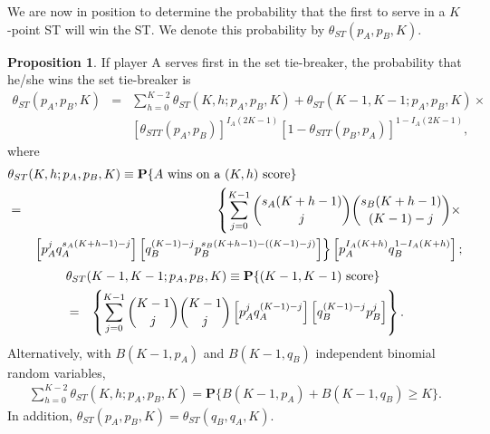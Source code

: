 \documentclass[11pt]{article}
\theoremstyle{plain}
\theoremstyle{definition}
\newtheorem{proposition}[theorem]{Proposition}
\renewcommand{\Pr}{\mathbf{P}}
\begin{document}
We are now in position to determine the probability that the first to serve in a $K$-point ST will win the ST. We denote this probability by $\theta_{ST}(p_A,p_B,K)$.

\begin{proposition}
\label{prop: set tie-breaker probs}
    If player A serves first in the set tie-breaker, the probability that he/she wins the set tie-breaker is
    \begin{eqnarray*}
    \theta_{ST}(p_A,p_B,K)  & = &  \sum_{h=0}^{K-2} \theta_{ST}(K,h;p_A,p_B,K) + 
     \theta_{ST}(K-1,K-1;p_A,p_B,K) \times \\ &&
     [\theta_{STT}(p_A,p_B)]^{I_A(2K-1)} [1-\theta_{STT}(p_B,p_A)]^{1-I_A(2K-1)},
    \end{eqnarray*}
    where
    \begin{eqnarray*}
   \lefteqn{     \theta_{ST}(K,h;p_A,p_B,K) \equiv  \Pr\{\mbox{$A$ wins on a $(K,h)$ score}\}  } \\ & = & \left\{
        \sum_{j=0}^{K-1} {s_A(K+h-1) \choose j} {s_B(K+h-1) \choose {(K-1) - j}} \times \right. \\
        && \left.
        \left[p_A^j q_A^{s_A(K+h-1) - j}\right]
        \left[q_B^{(K-1)-j} p_B^{s_B(K+h-1) - ((K-1)-j)}\right]
        \right\}  \left[p_A^{I_A(K+h)} q_B^{1-I_A(K+h)}\right];
    \end{eqnarray*}
    \begin{eqnarray*}
   \lefteqn{  \theta_{ST}(K-1,K-1;p_A,p_B,K)  \equiv   \Pr\{(K-1,K-1)\ \mbox{score}\} } \\ & = &
       \left\{
        \sum_{j=0}^{K-1} {{K-1} \choose j} {{K-1} \choose {j}}
        \left[p_A^j q_A^{(K-1) - j}\right]
        \left[q_B^{(K-1)-j} p_B^{j}\right]
        \right\}.
    \end{eqnarray*}
    Alternatively, with $B(K-1,p_A)$ and $B(K-1,q_B)$ independent binomial random variables,
    \begin{eqnarray*}
        \sum_{h=0}^{K-2} \theta_{ST}(K,h;p_A,p_B,K) =
        \Pr\{B(K-1,p_A) + B(K-1,q_B) \ge K\}.
    \end{eqnarray*}
In addition,
    $\theta_{ST}(p_A,p_B,K) = \theta_{ST}(q_B,q_A,K).$
\end{proposition}
\end{document}
